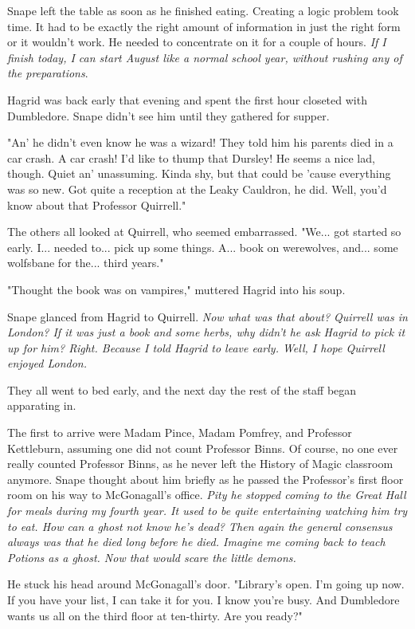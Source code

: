 \documentclass[a4paper,11pt]{article}
\begin{document}
Snape left the table as soon as he finished eating. Creating a logic problem took time. It had to be exactly the right amount of information in just the right form or it wouldn't work. He needed to concentrate on it for a couple of hours. \emph{If I finish today, I can start August like a normal school year, without rushing any of the preparations}.

Hagrid was back early that evening and spent the first hour closeted with Dumbledore. Snape didn't see him until they gathered for supper.

"An' he didn't even know he was a wizard! They told him his parents died in a car crash. A car crash! I'd like to thump that Dursley! He seems a nice lad, though. Quiet an' unassuming. Kinda shy, but that could be 'cause everything was so new. Got quite a reception at the Leaky Cauldron, he did. Well, you'd know about that Professor Quirrell."

The others all looked at Quirrell, who seemed embarrassed. "We... got started so early. I... needed to... pick up some things. A... book on werewolves, and... some wolfsbane for the... third years."

"Thought the book was on vampires," muttered Hagrid into his soup.

Snape glanced from Hagrid to Quirrell. \emph{Now what was that about? Quirrell was in London? If it was just a book and some herbs, why didn't he ask Hagrid to pick it up for him? Right. Because I told Hagrid to leave early. Well, I hope Quirrell enjoyed London.}

They all went to bed early, and the next day the rest of the staff began apparating in.

The first to arrive were Madam Pince, Madam Pomfrey, and Professor Kettleburn, assuming one did not count Professor Binns. Of course, no one ever really counted Professor Binns, as he never left the History of Magic classroom anymore. Snape thought about him briefly as he passed the Professor's first floor room on his way to McGonagall's office. \emph{Pity he stopped coming to the Great Hall for meals during my fourth year. It used to be quite entertaining watching him try to eat. How can a ghost not know he's dead? Then again the general consensus always was that he died long before he died. Imagine me coming back to teach Potions as a ghost. Now that would scare the little demons.}

He stuck his head around McGonagall's door. "Library's open. I'm going up now. If you have your list, I can take it for you. I know you're busy. And Dumbledore wants us all on the third floor at ten-thirty. Are you ready?"
\end{document}
